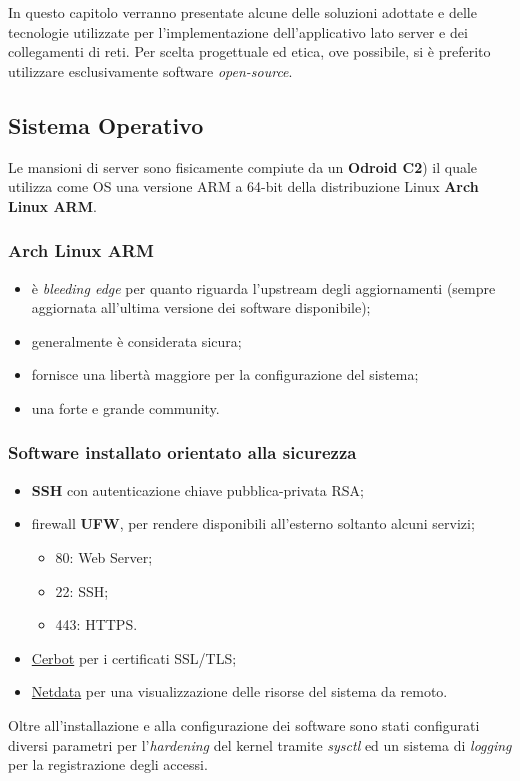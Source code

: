 In questo capitolo verranno presentate alcune delle soluzioni adottate e delle tecnologie utilizzate per l'implementazione dell'applicativo lato server e dei collegamenti di reti.
Per scelta progettuale ed etica, ove possibile, si è preferito utilizzare esclusivamente software \textit{open-source}.

\subsection{Sistema Operativo}
Le mansioni di server sono fisicamente compiute da un \textbf{Odroid C2}) il quale utilizza come OS una versione ARM a 64-bit della distribuzione Linux \textbf{Arch Linux ARM}.

\subsubsection{Arch Linux ARM} 
\begin{itemize}
	\item è \textit{bleeding edge} per quanto riguarda l'upstream degli aggiornamenti (sempre aggiornata all'ultima versione dei software disponibile);
	\item generalmente è considerata sicura;
	\item fornisce una libertà maggiore per la configurazione del sistema;
	\item una forte e grande community.
\end{itemize}

\subsubsection{Software installato orientato alla sicurezza}
\begin{itemize}
	\item \textbf{SSH} con autenticazione chiave pubblica-privata RSA;
	\item firewall \textbf{UFW}, per rendere disponibili all'esterno soltanto alcuni servizi;
	\begin{itemize}
		\item 80: Web Server;
		\item 22: SSH;
		\item 443: HTTPS.
	\end{itemize}
	\item \href{https://certbot.eff.org/}{Cerbot} per i certificati SSL/TLS;
	\item\href{https://github.com/firehol/netdata}{Netdata}  per una visualizzazione delle risorse del sistema da remoto.
\end{itemize}
Oltre all'installazione e alla configurazione dei software sono stati configurati diversi parametri per l'\textit{hardening} del kernel tramite \textit{sysctl} ed un sistema di \textit{logging} per la registrazione degli accessi.

